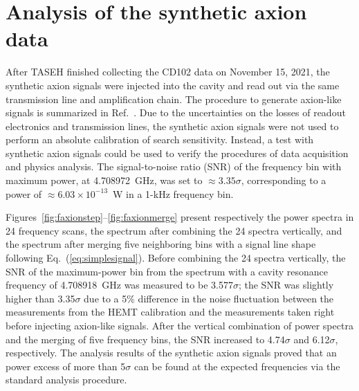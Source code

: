 \section{Analysis of the synthetic axion data}
After TASEH finished collecting the CD102 data on November 15, 2021, 
the synthetic axion signals were injected into the cavity and read out via the 
same transmission line and amplification chain. The procedure 
to generate axion-like signals is summarized in 
Ref.~\cite{TASEHInstrumentation}. 
Due to the uncertainties on the losses of readout electronics and transmission
 lines, the synthetic axion signals were not used to perform an absolute 
calibration of search sensitivity. Instead, 
a test with synthetic axion signals could be used to verify the procedures of 
data acquisition and physics analysis. The 
signal-to-noise ratio (SNR) of the frequency bin with maximum power, at 
4.708972~GHz, was set to $\approx 3.35\sigma$, corresponding to 
a power of $\approx 6.03 \times 10^{-13}$~W in a 1-kHz frequency bin.  

Figures~\ref{fig:faxionstep}--\ref{fig:faxionmerge} present respectively the 
power spectra in 24 frequency scans, the spectrum after combining the 24 
spectra vertically, and the spectrum after merging five neighboring bins with 
a signal line shape following Eq.~(\ref{eq:simplesignal}). Before combining 
the 24 spectra vertically, the SNR of the maximum-power bin from the spectrum 
with a cavity resonance frequency of 4.708918~GHz was measured to be 
3.577$\sigma$; the SNR was slightly higher than 3.35$\sigma$ due to a 
5\% difference in the noise fluctuation between the measurements from 
the HEMT calibration and the measurements taken 
right before injecting axion-like signals. After the vertical combination 
of power spectra and the merging of five frequency bins, the SNR increased to 
4.74$\sigma$ and 6.12$\sigma$, respectively. 
The analysis results of the synthetic axion signals proved that an power 
excess of more than 5$\sigma$ can be found at the expected frequencies via 
the standard analysis procedure.  

